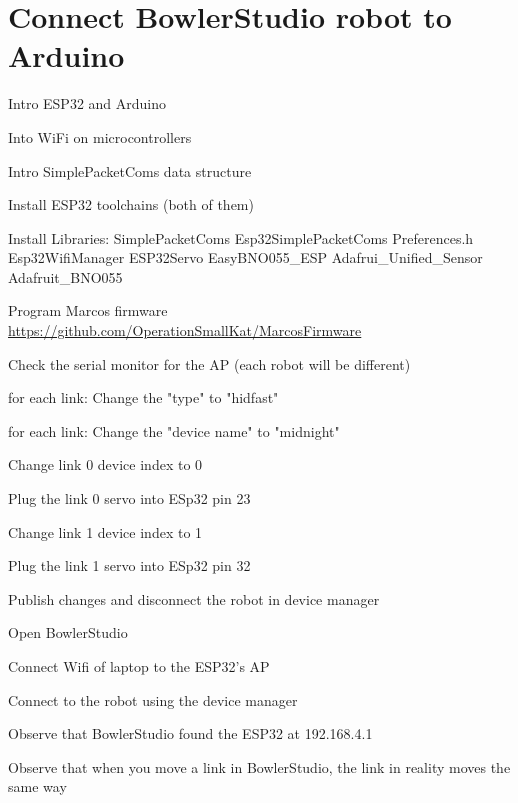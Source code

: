 \documentclass{article}
\begin{document}
\section{Connect BowlerStudio robot to Arduino}
\begin{todolist}
	\item Intro ESP32 and Arduino
	\item Into WiFi on microcontrollers
	\item Intro SimplePacketComs  data structure
	\item Install ESP32 toolchains (both of them)
	\item Install Libraries: SimplePacketComs Esp32SimplePacketComs	Preferences.h	Esp32WifiManager	ESP32Servo	EasyBNO055\_ESP Adafrui\_Unified\_Sensor	Adafruit\_BNO055
	\item Program Marcos firmware \url{https://github.com/OperationSmallKat/MarcosFirmware}
	\item Check the serial monitor for the AP (each robot will be different)
	\item for each link: Change the "type" to "hidfast"
	\item for each link: Change the "device name" to "midnight" 
	\item Change link 0 device index to 0
	\item Plug the link 0 servo into ESp32 pin 23
	\item Change link 1 device index to 1
	\item Plug the link 1 servo into ESp32 pin 32
	\item Publish changes and disconnect the robot in device manager	
	\item Open BowlerStudio 
	\item Connect Wifi of laptop to the ESP32's AP
	\item Connect to the robot using the device manager
	\item Observe that BowlerStudio found the ESP32 at 192.168.4.1
	\item Observe that when you move a link in BowlerStudio, the link in reality moves the same way
\end{todolist}
\end{document}
